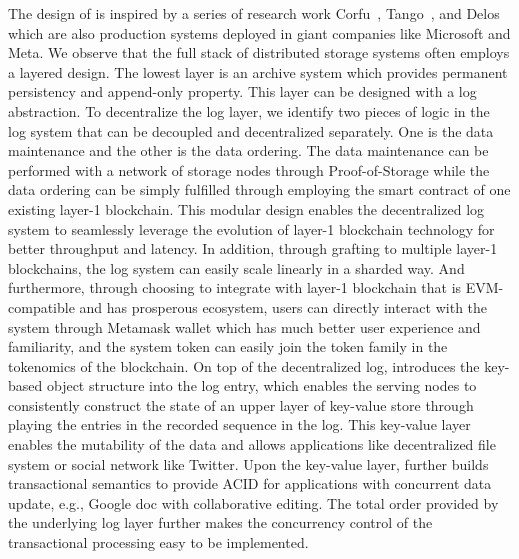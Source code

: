 The design of \project is inspired by a series of research work Corfu~\cite{corfu}, Tango~\cite{tango}, and Delos~\cite{delos} which are also production systems deployed in giant companies like Microsoft and Meta. We observe that the full stack of distributed storage systems often employs a layered design. The lowest layer is an archive system which provides permanent persistency and append-only property. This layer can be designed with a log abstraction. To decentralize the log layer, we identify two pieces of logic in the log system that can be decoupled and decentralized separately. One is the data maintenance and the other is the data ordering. The data maintenance can be performed with a network of storage nodes through Proof-of-Storage while the data ordering can be simply fulfilled through employing the smart contract of one existing layer-1 blockchain. This modular design enables the decentralized log system to seamlessly leverage the evolution of layer-1 blockchain technology for better throughput and latency. In addition, through grafting to multiple layer-1 blockchains, the log system can easily scale linearly in a sharded way. And furthermore, through choosing to integrate with layer-1 blockchain that is EVM-compatible and has prosperous ecosystem, users can directly interact with the system through Metamask wallet which has much better user experience and familiarity, and the system token can easily join the token family in the tokenomics of the blockchain.
On top of the decentralized log, \project introduces the key-based object structure into the log entry, which enables the serving nodes to consistently construct the state of an upper layer of key-value store through playing the entries in the recorded sequence in the log. This key-value layer enables the mutability of the data and allows applications like decentralized file system or social network like Twitter. Upon the key-value layer, \project further builds transactional semantics to provide ACID for applications with concurrent data update, e.g., Google doc with collaborative editing. The total order provided by the underlying log layer further makes the concurrency control of the transactional processing easy to be implemented. 

